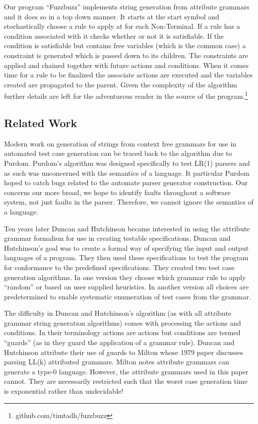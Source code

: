 Our program ``Fuzzbuzz'' implements string generation from attribute grammars
and it does so in a top down manner. It starts at the start symbol and
stochastically choose a rule to apply at for each Non-Terminal. If a rule has a
condition associated with it checks whether or not it is satisfiable. If the
condition is satisfiable but contains free variables (which is the common case)
a constraint is generated which is passed down to its children. The constraints
are applied and chained together with future actions and conditions. When it
comes time for a rule to be finalized the associate actions are executed and the
variables created are propagated to the parent. Given the complexity of the
algorithm further details are left for the adventurous reader in the source of
the program.\footnote{github.com/timtadh/fuzzbuzz}

\subsection{Related Work}

Modern work on generation of strings from context free grammars for use in
automated test case generation can be traced back to the algorithm due to
Purdom.\cite{Purdom1972} Purdom's algorithm was designed specifically to test
LR(1) parsers and as such was unconcerned with the semantics of a language. It
particular Purdom hoped to catch bugs related to the automate parser generator
construction. Our concerns our more broad, we hope to identify faults throughout
a software system, not just faults in the parser. Therefore, we cannot ignore
the semantics of a language.

Ten years later Duncan and Hutchinson became interested in using the attribute
grammar formalism for use in creating testable specifications.\cite{Duncan1981}
Duncan and Hutchinson's goal was to create a formal way of specifying the input
and output languages of a program. They then used these specifications to test
the program for conformance to the predefined specifications. They created two
test case generation algorithms. In one version they choose which grammar rule
to apply ``random'' or based on user supplied heuristics. In another version all
choices are predetermined to enable systematic enumeration of test cases from
the grammar.

The difficulty in Duncan and Hutchinson's algorithm (as with all attribute
grammar string generation algorithms) comes with processing the actions and
conditions. In their terminology actions are actions but conditions are termed
``guards'' (as in they guard the application of a grammar rule). Duncan and
Hutchinson attribute their use of guards to Milton whose 1979 paper discusses
parsing LL(k) attributed grammars.\cite{Milton1979} Milton notes attribute
grammars can generate a type-0 language. However, the attribute grammars used in
this paper cannot. They are necessarily restricted such that the worst case
generation time is exponential rather than undecidable! 

